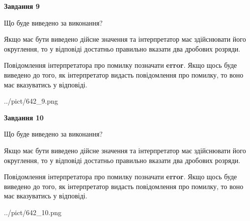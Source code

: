 \documentclass[12pt, ukrainian]{article}
\begin{document}
{\begin {Large}
{\begin {center}\textbf{Завдання 9}\end {center}}\par
Що буде виведено за виконання? \par

Якщо має бути виведено дійсне значення та інтерпретатор має здійснювати його округлення, 
то у відповіді достатньо правильно вказати два дробових розряди.

Повідомлення інтерпретатора про помилку позначати \textbf{error}.
Якщо щось буде виведено до того, як інтерпретатор видасть повідомлення про помилку, 
то воно має вказуватись у відповіді. \par

\begin{center}
	{../pict/642_9.png}
\end{center}
\newpage

{\begin {center}\textbf{Завдання 10}\end {center}}\par
Що буде виведено за виконання? \par

Якщо має бути виведено дійсне значення та інтерпретатор має здійснювати його округлення, 
то у відповіді достатньо правильно вказати два дробових розряди.

Повідомлення інтерпретатора про помилку позначати \textbf{error}.
Якщо щось буде виведено до того, як інтерпретатор видасть повідомлення про помилку, 
то воно має вказуватись у відповіді. \par

\begin{center}
	{../pict/642_10.png}
\end{center}
\newpage

\end {Large}}
\end{document}
